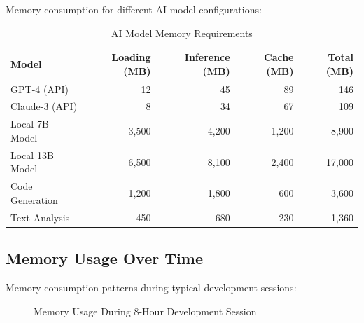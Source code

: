 Memory consumption for different AI model configurations:

\begin{table}[ht]
\centering
\caption{AI Model Memory Requirements}
\label{tab:ai-memory}
\begin{tabular}{@{}lrrrr@{}}
\toprule
\textbf{Model} & \textbf{Loading (MB)} & \textbf{Inference (MB)} & \textbf{Cache (MB)} & \textbf{Total (MB)} \\
\midrule
GPT-4 (API) & 12 & 45 & 89 & 146 \\
Claude-3 (API) & 8 & 34 & 67 & 109 \\
Local 7B Model & 3,500 & 4,200 & 1,200 & 8,900 \\
Local 13B Model & 6,500 & 8,100 & 2,400 & 17,000 \\
Code Generation & 1,200 & 1,800 & 600 & 3,600 \\
Text Analysis & 450 & 680 & 230 & 1,360 \\
\bottomrule
\end{tabular}
\end{table}

\subsection*{Memory Usage Over Time}

Memory consumption patterns during typical development sessions:

\begin{figure}[htb]
\centering
{}
\caption{Memory Usage During 8-Hour Development Session}
\label{fig:memory-over-time}
\end{figure}

